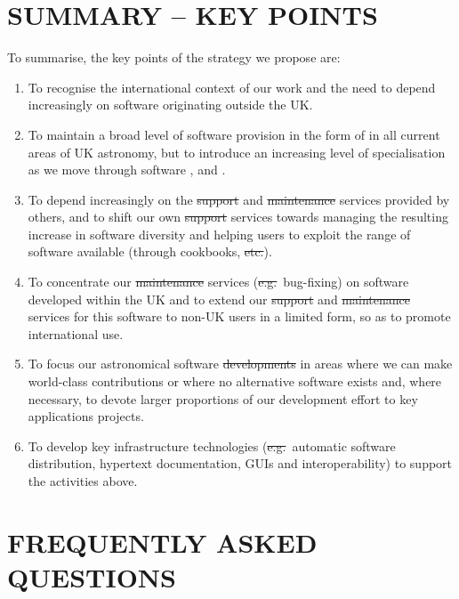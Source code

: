 \section{SUMMARY -- KEY POINTS}

To summarise, the key points of the strategy we propose are:

\begin{enumerate}

\item To recognise the international context of our work and
the need to depend increasingly on software originating outside the
UK.

\item To maintain a broad level of software provision in the form of
\st{} in all current areas of UK astronomy, but to
introduce an increasing level of specialisation as we move through
software \st{}, \st{} and \st{}.

\item To depend increasingly on the \st{support} and \st{maintenance}
services provided by others, and to shift our own \st{support}
services towards managing the resulting increase in software diversity
and helping users to exploit the range of software available
(through cookbooks, \st{etc.}).

\item To concentrate our \st{maintenance} services (\st{e.g.}\ bug-fixing) on
software developed within the UK and to extend our \st{support} and
\st{maintenance} services for this software to non-UK users in a
limited form, so as to promote international use.

\item To focus our astronomical software \st{developments} in areas where
we can make world-class contributions or where no alternative software
exists and, where necessary, to devote larger proportions of our
development effort to key applications projects.

\item To develop key infrastructure technologies (\st{e.g.}\ automatic
software distribution, hypertext documentation, GUIs and
interoperability) to support the activities above.
\end{enumerate}

\newpage
\appendix
\section{FREQUENTLY ASKED QUESTIONS}

